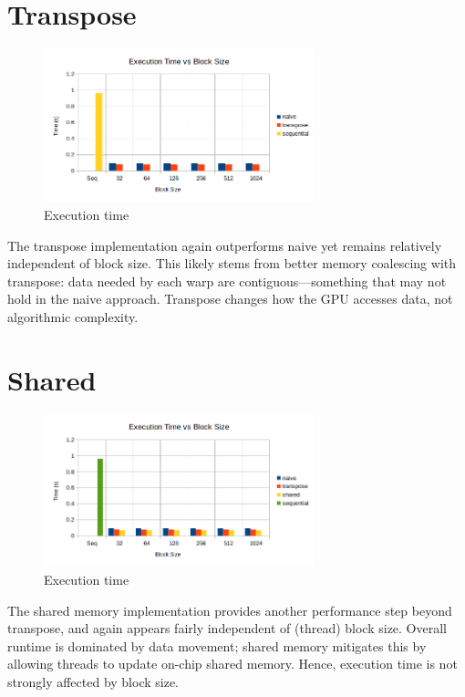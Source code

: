 \documentclass{article}
\newcommand{\eng}[1]{#1}
\begin{document}
\clearpage
\section{\eng{Transpose}}
\begin{figure}[h]\centering
        \includegraphics[width=0.7\textwidth]{../a4/plots/kmeans_seq_vs_naive_vs_trans.png}
        \caption{Execution time}
\end{figure}\FloatBarrier

The \eng{transpose} implementation again outperforms \eng{naive} yet remains relatively independent of \eng{block size}. This likely stems from better memory coalescing with \eng{transpose}: data needed by each \eng{warp} are contiguous—something that may not hold in the \eng{naive} approach. \eng{Transpose} changes how the GPU accesses data, not algorithmic complexity.

\section{\eng{Shared}}
\begin{figure}[h]\centering
        \includegraphics[width=0.7\textwidth]{../a4/plots/kmeans_seq_vs_naive_vs_trans_vs_shmem.png}
        \caption{Execution time}
\end{figure}

The \eng{shared memory} implementation provides another performance step beyond \eng{transpose}, and again appears fairly independent of \eng{(thread) block size}. Overall runtime is dominated by data movement; \eng{shared memory} mitigates this by allowing threads to update on-chip shared memory. Hence, execution time is not strongly affected by \eng{block size}.
\end{document}
